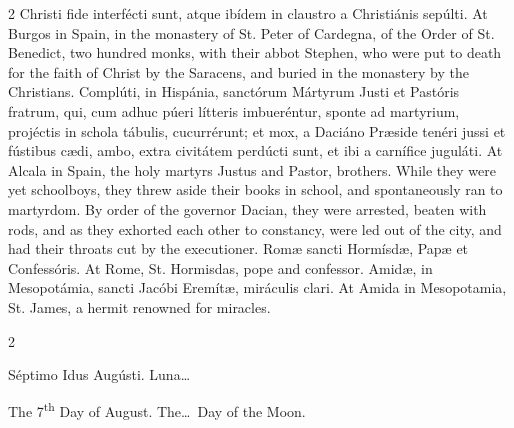 \begin{paracol}{2}
 Christi fide interfécti sunt, atque ibídem in claustro a Christiánis sepúlti.
\switchcolumn
{}
At Burgos in Spain, in the monastery 
 of St. Peter of Cardegna, of the Order of St. Benedict, two hundred monks, 
 with their abbot Stephen, who were put to death for the faith of Christ by 
 the Saracens, and buried in the monastery by the Christians.
\switchcolumn*
{}
Complúti, in Hispánia, 
 sanctórum Mártyrum Justi et Pastóris fratrum, qui, cum adhuc púeri lítteris 
 imbueréntur, sponte ad martyrium, projéctis in schola tábulis, cucurrérunt; 
 et mox, a Daciáno Præside tenéri jussi et fústibus cædi, ambo, extra 
 civitátem perdúcti sunt, et ibi a carnífice juguláti.
\switchcolumn
{}
At Alcala in Spain, the holy martyrs 
 Justus and Pastor, brothers. While they were yet schoolboys, they 
 threw aside their books in school, and spontaneously ran to martyrdom. 
 By order of the governor Dacian, they were arrested, beaten with rods, and 
 as they exhorted each other to constancy, were led out of the city, and had 
 their throats cut by the executioner.
\switchcolumn*
{}
Romæ sancti Hormísdæ, 
 Papæ et Confessóris.
\switchcolumn
{}
At Rome, St. Hormisdas, pope and 
 confessor.
\switchcolumn*
{}
Amidæ, in Mesopotámia, 
 sancti Jacóbi Eremítæ, miráculis clari.
\switchcolumn
{}
At Amida in Mesopotamia, St. James, a hermit 
 renowned for miracles.
\switchcolumn*
{}
\end{paracol}


\begin{paracol}{2}
\begin{center}{\color{gregoriocolor} Séptimo Idus Augústi. 
 Luna\dots\ }\end{center}
\switchcolumn
{}
\begin{center}{\color{gregoriocolor} The   7\textsuperscript{th} Day of 
 August. The\dots\ Day of the Moon.}\end{center}
\end{paracol}

